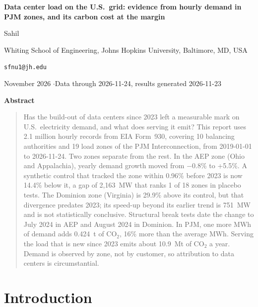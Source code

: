 \documentclass[11pt,a4paper]{article}
\begin{document}
\begin{center}
{\LARGE\bfseries Data center load on the U.S.\ grid: evidence from hourly demand in PJM zones, and its carbon cost at the margin\par}
\vspace{1.1em}
{\large Sahil\par}
\vspace{0.3em}
{\small Whiting School of Engineering, Johns Hopkins University, Baltimore, MD, USA\par}
{\small\texttt{sfnu1@jh.edu}\par}
\vspace{0.8em}
{\small November 2026 \quad$\cdot$\quad Data through 2026-11-24, results generated 2026-11-23\par}
\end{center}

\vspace{0.6em}
\begin{center}\textbf{Abstract}\end{center}
\begin{quote}\small
Has the build-out of data centers since 2023 left a measurable mark on U.S.\ electricity demand, and what does serving it emit? This report uses 2.1 million hourly records from EIA Form~930, covering 10 balancing authorities and 19 load zones of the PJM Interconnection, from 2019-01-01 to 2026-11-24. Two zones separate from the rest. In the AEP zone (Ohio and Appalachia), yearly demand growth moved from $-$0.8\% to +5.5\%. A synthetic control that tracked the zone within 0.96\% before 2023 is now 14.4\% below it, a gap of 2,163~MW that ranks 1 of 18 zones in placebo tests. The Dominion zone (Virginia) is 29.9\% above its control, but that divergence predates 2023; its speed-up beyond its earlier trend is 751~MW and is not statistically conclusive. Structural break tests date the change to July 2024 in AEP and August 2024 in Dominion. In PJM, one more MWh of demand adds 0.424~t of CO$_2$, 16\% more than the average MWh. Serving the load that is new since 2023 emits about 10.9~Mt of CO$_2$ a year. Demand is observed by zone, not by customer, so attribution to data centers is circumstantial.
\end{quote}

\section{Introduction}
\end{document}
